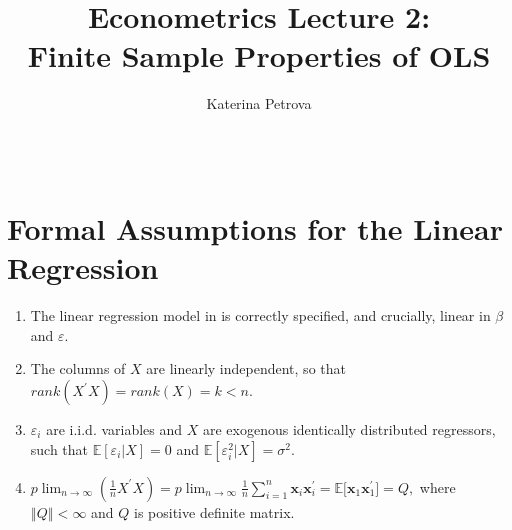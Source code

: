 \documentclass[notes=show]{beamer}
\begin{document}
\title{Econometrics Lecture 2: \\
Finite Sample Properties of OLS}
\author{Katerina Petrova \ \ \ \ \ \ \ \ \ \ \ \ \ \ \ \ \ \ \ \ \ \ \ \ \ \
\ \ \ \ \ \ \ \ \ \ \ \ \ \ \ \ \ \ \ \ \ \ \ \ \ \ \ \ \ \ \ \ \ \ \ \ \ \
\ \ \ \ \ \ \ \ \ \ \ \ \ \ \ \ \ \ \ \ \ \ \ }
\date{}
\maketitle

\section{Formal Assumptions for the Linear Regression}

\begin{frame}%


\begin{enumerate}
\item The linear regression model in is correctly specified, and crucially,
linear in $\beta $ and $\varepsilon .$

\item The columns of $X$ are linearly independent, so that $rank(X^{\prime
}X)=rank(X)=k<n.$

\item $\varepsilon _{i}$ are i.i.d. variables and $X$ are exogenous
identically distributed regressors, such that $\mathbb{E}[\varepsilon
_{i}|X]=0$ and $\mathbb{E}[\varepsilon _{i}^{2}|X]=\sigma ^{2}.$

\item $p\lim_{n\rightarrow \infty }(\frac{1}{n}X^{\prime
}X)=p\lim_{n\rightarrow \infty }\frac{1}{n}\sum_{i=1}^{n}\mathbf{x}_{i}%
\mathbf{x}_{i}^{\prime }=\mathbb{E[}\mathbf{x}_{1}\mathbf{x}_{1}^{\prime
}]=Q,$ where $\left\Vert Q\right\Vert <\infty $ and $Q$ is positive definite
matrix.
\end{enumerate}

\end{frame}%
\end{document}
